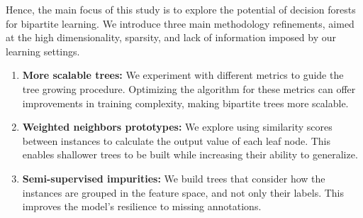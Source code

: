 \begin{itemize}
Hence, the main focus of this study is to explore the potential of decision forests for bipartite learning.
%
We introduce three main methodology refinements, aimed at the high dimensionality, sparsity, and lack of information imposed by our learning settings.

\begin{enumerate}
    \item \textbf{More scalable trees:}
    We experiment with different metrics to guide the tree growing procedure. Optimizing the algorithm for these metrics can offer improvements in training complexity, making bipartite trees more scalable.

    \item \textbf{Weighted neighbors prototypes:}
    We explore using similarity scores between instances to calculate the output value of each leaf node. This enables shallower trees to be built while increasing their ability to generalize. 

    \item \textbf{Semi-supervised impurities:}
    We build trees that consider how the instances are grouped in the feature space, and not only their labels. This improves the model's resilience to missing annotations.
\end{enumerate}



\end{itemize}

